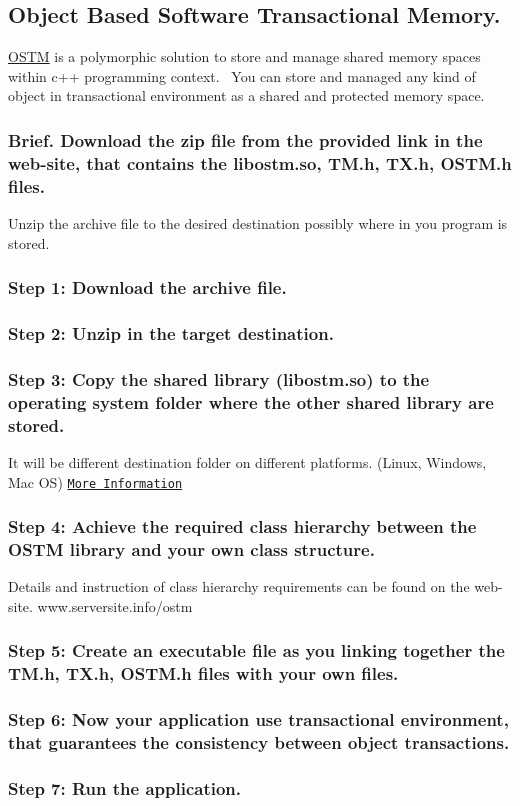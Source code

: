 \hypertarget{index_OSTM}{}\subsection{Object Based Software Transactional Memory.}\label{index_OSTM}
\hyperlink{class_o_s_t_m}{O\+S\+TM} is a polymorphic solution to store and manage shared memory spaces within c++ programming context.~\newline
 You can store and managed any kind of object in transactional environment as a shared and protected memory space.\hypertarget{index_install_sec}{}\subsubsection{Brief. Download the zip file from the provided link in the web-\/site, that contains the libostm.\+so, T\+M.\+h, T\+X.\+h, O\+S\+T\+M.\+h files.}\label{index_install_sec}
Unzip the archive file to the desired destination possibly where in you program is stored.\hypertarget{index_step1}{}\subsubsection{Step 1\+: Download the archive file.}\label{index_step1}
\hypertarget{index_step2}{}\subsubsection{Step 2\+: Unzip in the target destination.}\label{index_step2}
\hypertarget{index_step3}{}\subsubsection{Step 3\+: Copy the shared library (libostm.\+so) to the operating system folder where the other shared library are stored.}\label{index_step3}
It will be different destination folder on different platforms. (Linux, Windows, Mac OS) \href{http://serversite.info/ostm/#tutorial}{\tt More Information}\hypertarget{index_step4}{}\subsubsection{Step 4\+: Achieve the required class hierarchy between the O\+S\+T\+M library and your own class structure.}\label{index_step4}
Details and instruction of class hierarchy requirements can be found on the web-\/site. www.\+serversite.\+info/ostm\hypertarget{index_step5}{}\subsubsection{Step 5\+: Create an executable file as you linking together the T\+M.\+h, T\+X.\+h, O\+S\+T\+M.\+h files with your own files.}\label{index_step5}
\hypertarget{index_step6}{}\subsubsection{Step 6\+: Now your application use transactional environment, that guarantees the consistency between object transactions.}\label{index_step6}
\hypertarget{index_step7}{}\subsubsection{Step 7\+: Run the application.}\label{index_step7}
